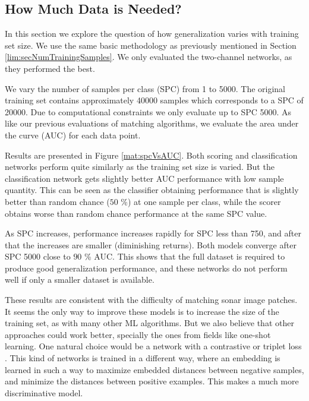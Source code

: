 \FloatBarrier
\subsection{How Much Data is Needed?}

In this section we explore the question of how generalization varies with training set size. We use the same basic methodology as previously mentioned in Section \ref{lim:secNumTrainingSamples}. We only evaluated the two-channel networks, as they performed the best.

We vary the number of samples per class (SPC) from 1 to 5000. The original training set contains approximately 40000 samples which corresponds to a SPC of 20000. Due to computational constraints we only evaluate up to SPC 5000. As like our previous evaluations of matching algorithms, we evaluate the area under the curve (AUC) for each data point.

Results are presented in Figure \ref{mat:spcVsAUC}. Both scoring and classification networks perform quite similarly as the training set size is varied. But the classification network gets slightly better AUC performance with low sample quantity. This can be seen as the classifier obtaining performance that is slightly better than random chance ($50$ \%) at one sample per class, while the scorer obtains worse than random chance performance at the same SPC value.

As SPC increases, performance increases rapidly for SPC less than 750, and after that the increases are smaller (diminishing returns). Both models converge after SPC 5000 close to $90$ \% AUC. This shows that the full dataset is required to produce good generalization performance, and these networks do not perform well if only a smaller dataset is available.

These results are consistent with the difficulty of matching sonar image patches. It seems the only way to improve these models is to increase the size of the training set, as with many other ML algorithms. But we also believe that other approaches could work better, specially the ones from fields like one-shot learning. One natural choice would be a network with a contrastive or triplet loss \cite{Schroff_2015_CVPR}. This kind of networks is trained in a different way, where an embedding is learned in such a way to maximize embedded distances between negative samples, and minimize the distances between positive examples. This makes a much more discriminative model.


